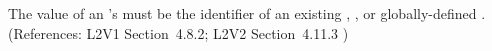 The value of an \AssignmentRule's  must be the identifier
of an existing \Compartment, \Species, or globally-defined \Parameter.
(References: L2V1 Section~4.8.2; L2V2 Section~4.11.3 )
